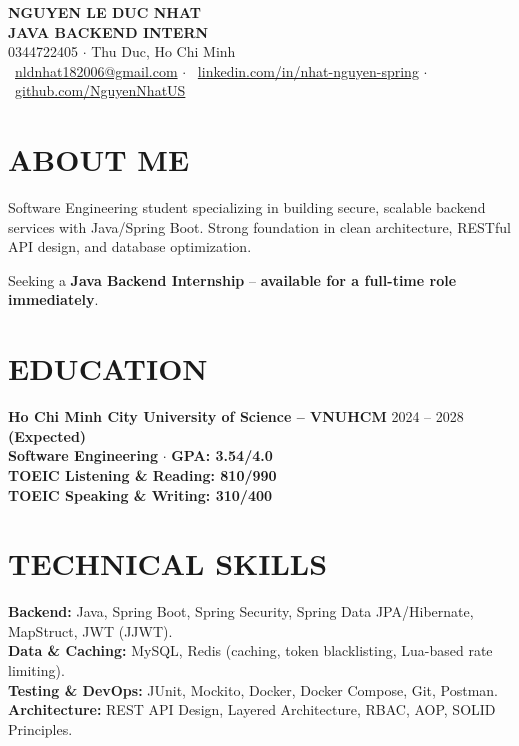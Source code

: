 \documentclass[a4paper,10pt]{article}
\begin{document}
\begin{center}
    {\LARGE \textbf{NGUYEN LE DUC NHAT}}\\[4pt]
    {\large \textbf{JAVA BACKEND INTERN}}\\[5pt]
    0344722405 $\cdot$ Thu Duc, Ho Chi Minh\\[3pt]
    \faEnvelope\ \href{mailto:nldnhat182006@gmail.com}{nldnhat182006@gmail.com} $\cdot$
    \faLinkedin\ \href{https://linkedin.com/in/nhat-nguyen-spring}{linkedin.com/in/nhat-nguyen-spring} $\cdot$
    \faGithub\ \href{https://github.com/NguyenNhatUS}{github.com/NguyenNhatUS}
\end{center}

\section*{ABOUT ME}
Software Engineering student specializing in building secure, scalable backend services with Java/Spring Boot. Strong foundation in clean architecture, RESTful API design, and database optimization. 

Seeking a \textbf{Java Backend Internship} -- \textbf{available for a full-time role immediately}.

\section*{EDUCATION}
\textbf{Ho Chi Minh City University of Science -- VNUHCM} \hfill 2024 -- 2028 \textbf{(Expected)}\\
\textbf{Software Engineering} $\cdot$ \textbf{GPA: 3.54/4.0}\\[2pt]
\textbf{TOEIC Listening \& Reading: 810/990}\\
\textbf{TOEIC Speaking \& Writing: 310/400}

\section*{TECHNICAL SKILLS}
\textbf{Backend:} Java, Spring Boot, Spring Security, Spring Data JPA/Hibernate, MapStruct, JWT (JJWT).\\[2.5pt]
\textbf{Data \& Caching:} MySQL, Redis (caching, token blacklisting, Lua-based rate limiting).\\[2.5pt]
\textbf{Testing \& DevOps:} JUnit, Mockito, Docker, Docker Compose, Git, Postman.\\[2.5pt]
\textbf{Architecture:} REST API Design, Layered Architecture, RBAC, AOP, SOLID Principles.
\end{document}
